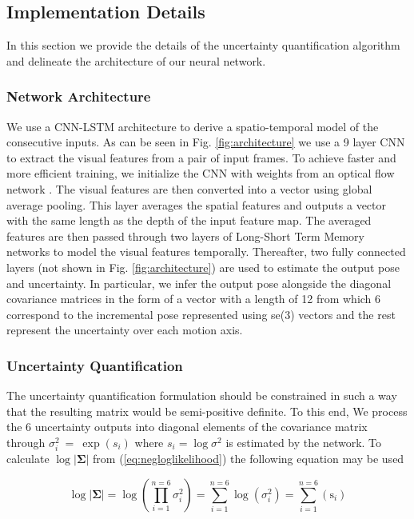 \documentclass[letterpaper, 10 pt]{ieeeconf}  %
\begin{document}
\subsection{Implementation Details}
In this section we provide the details of the uncertainty quantification algorithm and delineate the architecture of our neural network.

\subsubsection{Network Architecture}
We use a CNN-LSTM architecture to derive a spatio-temporal model of the consecutive inputs. As can be seen in Fig. \ref{fig:architecture} we use a 9 layer CNN to extract the visual features from a pair of input frames. To achieve faster and more efficient training, we initialize the CNN with weights from an optical flow network \cite{ilg2017flownet}.
The visual features are then converted into a vector using global average pooling. This layer averages the spatial features and outputs a vector with the same length as the depth of the input feature map. The averaged features are then passed through two layers of Long-Short Term Memory networks to model the visual features temporally. Thereafter, two fully connected layers (not shown in Fig. \ref{fig:architecture}) are used to estimate the output pose and uncertainty. In particular, we infer the output pose alongside the diagonal covariance matrices in the form of a vector with a length of 12 from which 6 correspond to the incremental pose represented using se(3) vectors and the rest represent the uncertainty over each motion axis. 

\subsubsection{Uncertainty Quantification}
The uncertainty quantification formulation should be constrained in such a way that the resulting matrix would be semi-positive definite. To this end, We process the 6 uncertainty outputs into diagonal elements of the covariance matrix through $\sigma_i^2~=~\exp{(s_i)}$ where $s_i=\log\sigma^2$ is estimated by the network. To calculate $\log{|\boldsymbol{\Sigma}|}$ from (\ref{eq:negloglikelihood}) the following equation may be used

\begin{equation}
\log{|\boldsymbol{\Sigma}|}=\log(\prod_{i=1}^{n=6}\sigma^{2}_{i}) = \sum_{i=1}^{n=6}\log(\sigma^2_i) = \sum_{i=1}^{n=6}(\text{s}_i)
\label{eq:quantifiationf2f}
\end{equation}
\end{document}
